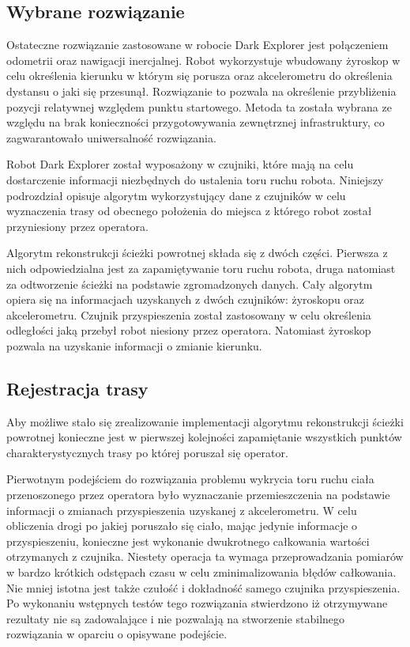 \subsection{Wybrane rozwiązanie}
Ostateczne rozwiązanie zastosowane w robocie Dark Explorer jest połączeniem
odometrii oraz nawigacji inercjalnej. Robot wykorzystuje wbudowany żyroskop w
celu określenia kierunku w którym się porusza oraz akcelerometru do określenia
dystansu o jaki się przesunął. Rozwiązanie to pozwala na określenie przybliżenia
pozycji relatywnej względem punktu startowego. Metoda ta została wybrana ze
względu na brak konieczności przygotowywania zewnętrznej infrastruktury, co
zagwarantowało uniwersalność rozwiązania.

Robot Dark Explorer został wyposażony w czujniki, które mają na celu dostarczenie
informacji niezbędnych do ustalenia toru ruchu robota. Niniejszy podrozdział
opisuje algorytm wykorzystujący dane z czujników w celu wyznaczenia trasy od
obecnego położenia do miejsca z którego robot został przyniesiony przez
operatora.

Algorytm rekonstrukcji ścieżki powrotnej składa się z dwóch części. Pierwsza z
nich odpowiedzialna jest za zapamiętywanie toru ruchu robota, druga natomiast za
odtworzenie ścieżki na podstawie zgromadzonych danych. Cały algorytm opiera się
na informacjach uzyskanych z dwóch czujników: żyroskopu oraz akcelerometru.
Czujnik przyspieszenia został zastosowany w celu określenia odległości jaką
przebył robot niesiony przez operatora. Natomiast żyroskop pozwala na uzyskanie
informacji o zmianie kierunku.

\subsection{Rejestracja trasy}
Aby możliwe stało się zrealizowanie implementacji algorytmu rekonstrukcji
ścieżki powrotnej konieczne jest w pierwszej kolejności zapamiętanie wszystkich
punktów charakterystycznych trasy po której poruszał się operator.

Pierwotnym podejściem do rozwiązania problemu wykrycia toru ruchu ciała
przenoszonego przez operatora było wyznaczanie przemieszczenia na
podstawie informacji o zmianach przyspieszenia uzyskanej z akcelerometru.
W celu obliczenia drogi po jakiej poruszało się ciało, mając jedynie informacje 
o przyspieszeniu, konieczne jest wykonanie dwukrotnego całkowania wartości 
otrzymanych z czujnika. Niestety operacja ta wymaga przeprowadzania pomiarów w
bardzo krótkich odstępach czasu w celu zminimalizowania błędów całkowania.
Nie mniej istotna jest także czułość i dokładność samego czujnika
przyspieszenia. Po wykonaniu wstępnych testów tego rozwiązania stwierdzono iż
otrzymywane rezultaty nie są zadowalające  i nie pozwalają na stworzenie
stabilnego rozwiązania w oparciu o opisywane podejście. 

